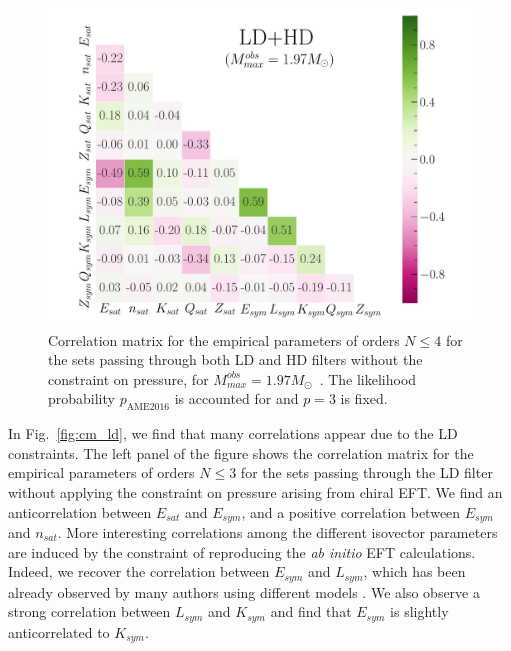 \begin{figure}[!t]
\begin{center}
  \includegraphics[width=0.9\linewidth]{figures/cm_ldhd.pdf}
\end{center}
\caption[Correlations among empirical parameters for the sets passing through
both low-density and high-density filters]{Correlation matrix for the empirical 
  parameters of orders $N \leq 4$ for the sets passing through both LD and HD 
  filters without the constraint on pressure, for 
  $M_{max}^{obs}=1.97M_\odot$~\cite{Antoniadis2013}. The likelihood probability 
$p_{\text{AME2016}}$ is accounted for and $p=3$ is fixed.}\label{fig:cm_ldhd}
\end{figure}
 
In Fig.~\ref{fig:cm_ld}, we find that many correlations appear due to the LD 
constraints. The left panel of the figure shows the correlation matrix for the 
empirical parameters of orders $N \leq 3$ for the sets passing through the LD 
filter without applying the constraint on pressure arising from chiral EFT. We 
find an anticorrelation between $E_{sat}$ and $E_{sym}$, and a positive 
correlation between $E_{sym}$ and $n_{sat}$. More interesting correlations 
among the different isovector parameters are induced by the constraint of 
reproducing the \textit{ab initio} EFT calculations. Indeed, we recover the 
correlation between $E_{sym}$ and $L_{sym}$, which has been already observed by 
many authors using different models 
\cite{Lim2019tidal,Kortelainen2012,Danielewicz2014,Trippa2008,Colo2014}.
We also observe a strong correlation between $L_{sym}$ and $K_{sym}$ and find
that $E_{sym}$ is slightly anticorrelated to $K_{sym}$.

